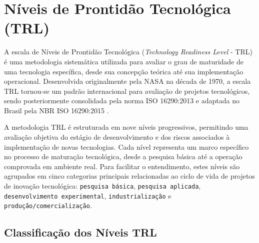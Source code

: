 \section{Níveis de Prontidão Tecnológica (TRL)}\label{trl}

\par A escala de Níveis de Prontidão Tecnológica (\textit{Technology Readiness Level} - TRL) é uma metodologia sistemática utilizada para avaliar o grau de maturidade de uma tecnologia específica, desde sua concepção teórica até sua implementação operacional. Desenvolvida originalmente pela NASA na década de 1970, a escala TRL tornou-se um padrão internacional para avaliação de projetos tecnológicos, sendo posteriormente consolidada pela norma ISO 16290:2013 e adaptada no Brasil pela NBR ISO 16290:2015 \cite{trl:2025}.

\par A metodologia TRL é estruturada em nove níveis progressivos, permitindo uma avaliação objetiva do estágio de desenvolvimento e dos riscos associados à implementação de novas tecnologias. Cada nível representa um marco específico no processo de maturação tecnológica, desde a pesquisa básica até a operação comprovada em ambiente real. Para facilitar o entendimento, estes níveis são agrupados em cinco categorias principais relacionadas ao ciclo de vida de projetos de inovação tecnológica: \texttt{pesquisa básica}, \texttt{pesquisa aplicada}, \texttt{desenvolvimento experimental}, \texttt{industrialização} e \texttt{produção/comercialização}.

\subsection{Classificação dos Níveis TRL}

